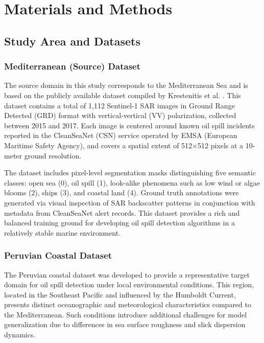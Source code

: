 \documentclass[12pt]{article}
\begin{document}
\section{Materials and Methods}

\subsection{Study Area and Datasets}

\subsubsection{Mediterranean (Source) Dataset}
The source domain in this study corresponds to the Mediterranean Sea and is based on the publicly available dataset compiled by Krestenitis et al. \cite{krestenitisOilSpillIdentification2019}. This dataset contains a total of 1,112 Sentinel-1 SAR images in Ground Range Detected (GRD) format with vertical-vertical (VV) polarization, collected between 2015 and 2017. Each image is centered around known oil spill incidents reported in the CleanSeaNet (CSN) service operated by EMSA (European Maritime Safety Agency), and covers a spatial extent of 512×512 pixels at a 10-meter ground resolution.

The dataset includes pixel-level segmentation masks distinguishing five semantic classes: open sea (0), oil spill (1), look-alike phenomena such as low wind or algae blooms (2), ships (3), and coastal land (4). Ground truth annotations were generated via visual inspection of SAR backscatter patterns in conjunction with metadata from CleanSeaNet alert records. This dataset provides a rich and balanced training ground for developing oil spill detection algorithms in a relatively stable marine environment.

\subsubsection{Peruvian Coastal Dataset}

The Peruvian coastal dataset was developed to provide a representative target domain for oil spill detection under local environmental conditions. This region, located in the Southeast Pacific and influenced by the Humboldt Current, presents distinct oceanographic and meteorological characteristics compared to the Mediterranean. Such conditions introduce additional challenges for model generalization due to differences in sea surface roughness and slick dispersion dynamics.
\end{document}
